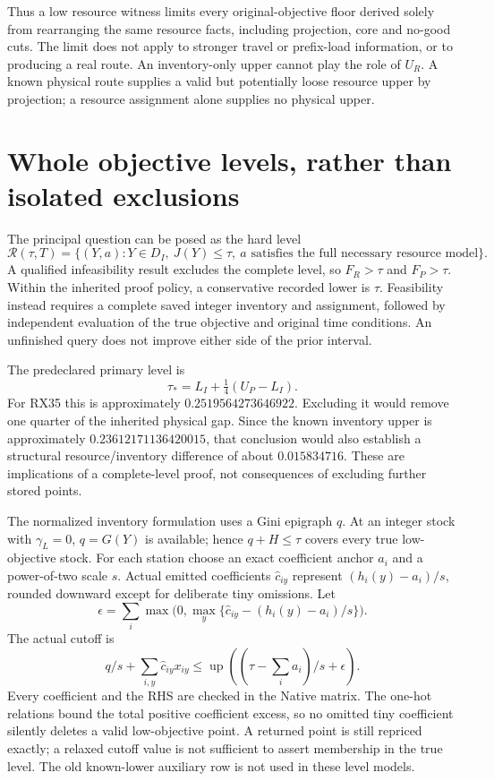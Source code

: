 \documentclass[11pt]{article}
\begin{document}
Thus a low resource witness limits every original-objective floor derived
solely from rearranging the same resource facts, including projection,
core and no-good cuts. The limit does not apply to stronger travel or
prefix-load information, or to producing a real route. An inventory-only
upper cannot play the role of $U_R$. A known physical route supplies a
valid but potentially loose resource upper by projection; a resource
assignment alone supplies no physical upper.

\section{Whole objective levels, rather than isolated exclusions}
The principal question can be posed as the hard level
\[
 \mathcal R(\tau,T)=\{(Y,a):Y\in D_I,\ J(Y)\le\tau,
               \ a\text{ satisfies the full necessary resource model}\}.
\]
A qualified infeasibility result excludes the complete level, so
$F_R>\tau$ and $F_P>\tau$. Within the inherited proof policy, a conservative
recorded lower is $\tau$. Feasibility instead requires a complete saved
integer inventory and assignment, followed by independent evaluation of
the true objective and original time conditions. An unfinished query
does not improve either side of the prior interval.

The predeclared primary level is
\[
 \tau_* = L_I+\tfrac14(U_P-L_I).
\]
For RX35 this is approximately $0.2519564273646922$. Excluding it would
remove one quarter of the inherited physical gap. Since the known
inventory upper is approximately $0.23612171136420015$, that conclusion
would also establish a structural resource/inventory difference of about
$0.015834716$. These are implications of a complete-level proof, not
consequences of excluding further stored points.

The normalized inventory formulation uses a Gini epigraph $q$. At an
integer stock with $\gamma_L=0$, $q=G(Y)$ is available; hence
$q+H\le\tau$ covers every true low-objective stock. For each station choose
an exact coefficient anchor $a_i$ and a power-of-two scale $s$. Actual
emitted coefficients $\widehat c_{iy}$ represent
$(h_i(y)-a_i)/s$, rounded downward except for deliberate tiny omissions.
Let
\[
 \epsilon=\sum_i\max\bigl(0,\max_y\{
 \widehat c_{iy}-(h_i(y)-a_i)/s\}\bigr).
\]
The actual cutoff is
\[
 q/s+\sum_{i,y}\widehat c_{iy}x_{iy}
 \le \operatorname{up}\!\left((\tau-\sum_i a_i)/s+\epsilon\right).
\]
Every coefficient and the RHS are checked in the Native matrix. The
one-hot relations bound the total positive coefficient excess, so no
omitted tiny coefficient silently deletes a valid low-objective point.
A returned point is still repriced exactly; a relaxed cutoff value is
not sufficient to assert membership in the true level. The old
known-lower auxiliary row is not used in these level models.
\end{document}
